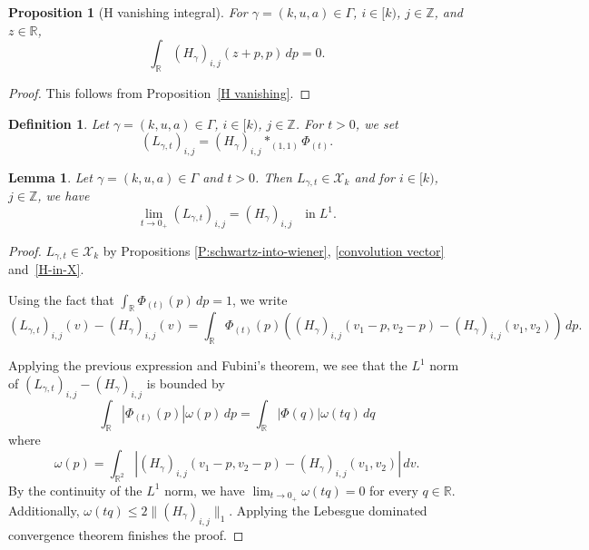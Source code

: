 \documentclass[12pt,reqno]{amsart}
\theoremstyle{plain}
\newtheorem{lemma}[theorem]{Lemma}
\newtheorem{proposition}[theorem]{Proposition}
\newtheorem{definition}[theorem]{Definition}
\numberwithin{equation}{section}
\theoremstyle{remark}
\newcommand{\using}[1]{}
\newcommand{\Z}{{\mathbb Z}}
\newcommand{\R}{{\mathbb R}}
\begin{document}
\begin{proposition}[H vanishing integral]\label{H vanishing integral}\using{H vanishing}
    For $\gamma=(k,u,a)\in \Gamma$, $i\in [k)$, $j\in \Z$, and $z\in \R$,
\begin{equation}\label{auto:H-kernel-diagonal-cancellation-integral}
   \int_{\R} (H_{\gamma})_{i,j}(z+p,p)\,dp=0.
\end{equation}
\end{proposition}

\begin{proof}
This follows from Proposition~\ref{H vanishing}.
\end{proof}


\begin{definition}\label{auto:L-kernel-definition}
Let $\gamma=(k,u,a)\in \Gamma$, $i\in [k)$, $j\in \Z$. For $t>0$, we set
\begin{equation}\label{auto:L-kernel-convolution}
(L_{\gamma,t})_{i,j} =(H_{\gamma})_{i,j} \ast_{(1,1)} \Phi_{(t)}.
\end{equation}
\end{definition}

\begin{lemma}\label{L:F_t}\using{P:schwartz-into-wiener}\using{convolution vector}\using{H-in-X}
Let $\gamma=(k,u,a)\in \Gamma$ and $t>0$. Then $L_{\gamma,t} \in \mathcal{X}_k$ and for $i\in [k)$, $j\in \Z$, we have
\begin{equation}\label{auto:L-kernel-small-scale-limit}
\lim_{t\to 0_+} (L_{\gamma,t})_{i,j} = (H_{\gamma})_{i,j} \quad\text{in}\;L^1.
\end{equation}
\end{lemma}

\begin{proof}
$L_{\gamma,t} \in \mathcal{X}_k$ by Propositions \ref{P:schwartz-into-wiener}, \ref{convolution vector}  and~\ref{H-in-X}.

Using the fact that $\int_{\R} \Phi_{(t)}(p)\,dp=1$, we write
\[
(L_{\gamma,t})_{i,j}(v)-(H_{\gamma})_{i,j}(v)
=\int_{\R} \Phi_{(t)}(p) ((H_\gamma)_{i,j}(v_1-p,v_2-p)-(H_\gamma)_{i,j}(v_1,v_2))\,dp.
\]

Applying the previous expression and Fubini's theorem, we see that the $L^1$ norm of $(L_{\gamma,t})_{i,j}-(H_{\gamma})_{i,j}$ is bounded by
\[
\int_{\R} |\Phi_{(t)}(p)| \omega(p)\,dp
=\int_{\R} |\Phi(q)| \omega(tq)\,dq
\]
where
\[
\omega(p)=\int_{\R^2} |(H_\gamma)_{i,j}(v_1-p,v_2-p)-(H_\gamma)_{i,j}(v_1,v_2)|\,dv.
\]
By the continuity of the $L^1$ norm, we have $\lim_{t\to 0_+} \omega(tq)=0$ for every $q\in \R$. Additionally, $\omega(tq) \leq 2\|(H_{\gamma})_{i,j}\|_1$. Applying the Lebesgue dominated convergence theorem finishes the proof.
\end{proof}
\end{document}
